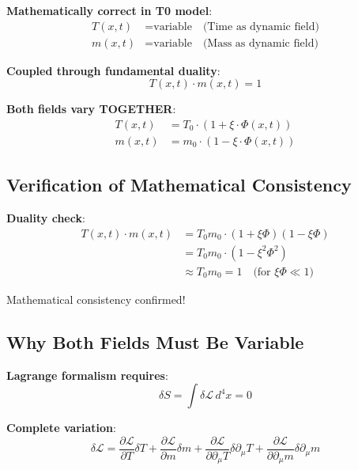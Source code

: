 \documentclass[12pt,a4paper]{article}
\newcommand{\xipar}{\xi}
\theoremstyle{definition}
\theoremstyle{remark}
\begin{document}
	\textbf{Mathematically correct in T0 model}:
	\begin{align}
		T(x,t) &= \text{variable} \quad \text{(Time as dynamic field)} \\
		m(x,t) &= \text{variable} \quad \text{(Mass as dynamic field)}
	\end{align}
	
	\textbf{Coupled through fundamental duality}:
	\begin{equation}
		T(x,t) \cdot m(x,t) = 1
	\end{equation}
	
	\textbf{Both fields vary TOGETHER}:
	\begin{align}
		T(x,t) &= T_0 \cdot (1 + \xipar \cdot \Phi(x,t)) \\
		m(x,t) &= m_0 \cdot (1 - \xipar \cdot \Phi(x,t))
	\end{align}
	
	\subsection{Verification of Mathematical Consistency}
	
	\textbf{Duality check}:
	\begin{align}
		T(x,t) \cdot m(x,t) &= T_0 m_0 \cdot (1 + \xipar \Phi)(1 - \xipar \Phi) \\
		&= T_0 m_0 \cdot (1 - \xipar^2 \Phi^2) \\
		&\approx T_0 m_0 = 1 \quad \text{(for } \xipar \Phi \ll 1\text{)}
	\end{align}
	
	Mathematical consistency confirmed!
	
	\subsection{Why Both Fields Must Be Variable}
	
	\textbf{Lagrange formalism requires}:
	\begin{equation}
		\delta S = \int \delta \mathcal{L} \, d^4x = 0
	\end{equation}
	
	\textbf{Complete variation}:
	\begin{equation}
		\delta \mathcal{L} = \frac{\partial \mathcal{L}}{\partial T}\delta T + \frac{\partial \mathcal{L}}{\partial m}\delta m + \frac{\partial \mathcal{L}}{\partial \partial_\mu T}\delta \partial_\mu T + \frac{\partial \mathcal{L}}{\partial \partial_\mu m}\delta \partial_\mu m
	\end{equation}
	
\end{document}
